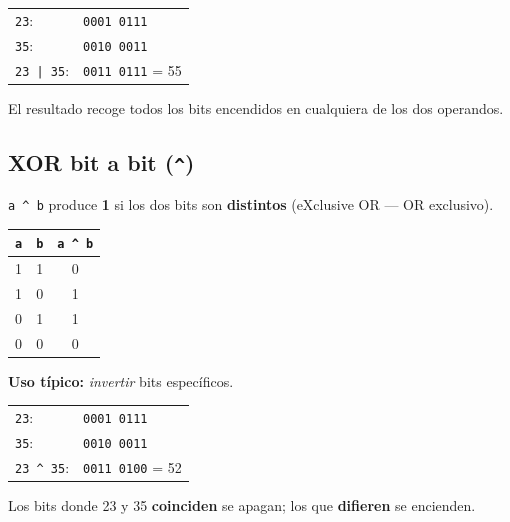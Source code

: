 \documentclass[12pt, oneside]{article}
\begin{document}
\begin{ejemplo}[\texttt{23 | 35 = 55}]
\begin{center}
\begin{tabular}{ll}
  \texttt{23}:      & \texttt{0001 0111} \\
  \texttt{35}:      & \texttt{0010 0011} \\
  \texttt{23 | 35}: & \texttt{0011 0111} = 55 \\
\end{tabular}
\end{center}
El resultado recoge todos los bits encendidos en cualquiera de los dos operandos.
\end{ejemplo}

\subsection{XOR bit a bit (\texttt{\textasciicircum})}

\texttt{a \textasciicircum{} b} produce \textbf{1} si los dos bits son
\textbf{distintos} (eXclusive OR — OR exclusivo).

\begin{center}
\begin{tabular}{ccc}
  \toprule
  \texttt{a} & \texttt{b} & \texttt{a \textasciicircum{} b} \\
  \midrule
  1 & 1 & 0 \\
  1 & 0 & 1 \\
  0 & 1 & 1 \\
  0 & 0 & 0 \\
  \bottomrule
\end{tabular}
\end{center}

\textbf{Uso típico:} \textit{invertir} bits específicos.

\begin{ejemplo}[\texttt{23 \textasciicircum{} 35 = 52}]
\begin{center}
\begin{tabular}{ll}
  \texttt{23}:                      & \texttt{0001 0111} \\
  \texttt{35}:                      & \texttt{0010 0011} \\
  \texttt{23 \textasciicircum{} 35}: & \texttt{0011 0100} = 52 \\
\end{tabular}
\end{center}
Los bits donde 23 y 35 \textbf{coinciden} se apagan; los que \textbf{difieren}
se encienden.
\end{ejemplo}
\end{document}
